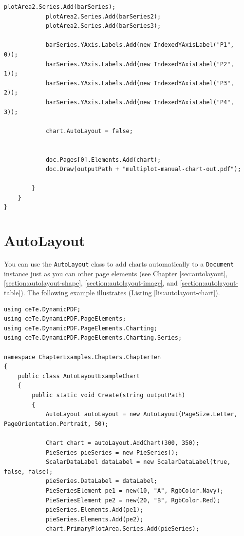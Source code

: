 \documentclass[american,letterpaper]{tufte-book}
\numberwithin{equation}{section}
\numberwithin{figure}{section}
\begin{document}
{\begin{lstlisting}[caption={A chart with two plot areas.},label={lis:two-plot-A-chart-with},basicstyle={\small\ttfamily},breaklines=true]
            plotArea2.Series.Add(barSeries);
            plotArea2.Series.Add(barSeries2);
            plotArea2.Series.Add(barSeries3);

            barSeries.YAxis.Labels.Add(new IndexedYAxisLabel("P1", 0));
            barSeries.YAxis.Labels.Add(new IndexedYAxisLabel("P2", 1));
            barSeries.YAxis.Labels.Add(new IndexedYAxisLabel("P3", 2));
            barSeries.YAxis.Labels.Add(new IndexedYAxisLabel("P4", 3));

            chart.AutoLayout = false;


            doc.Pages[0].Elements.Add(chart);
            doc.Draw(outputPath + "multiplot-manual-chart-out.pdf");

        }
    }
}
\end{lstlisting}
\leavevmode\egroup

\section{AutoLayout}
\label{section:autolayout-charts}
You can use the \texttt{AutoLayout} class to add charts automatically to a \texttt{Document} instance just as you can other page elements (see Chapter \ref{sec:autolayout}, \ref{section:autolayout-shape}, \ref{section:autolayout-image}, and \ref{section:autolayout-table}). The following example illustrates (Listing \ref{lis:autolayout-chart}).

\bgroup{}
\begin{lstlisting}[caption={Using AutoLayout to create a PDF document.},label={lis:autolayout-chart},basicstyle={\small\ttfamily},breaklines=true]
using ceTe.DynamicPDF;
using ceTe.DynamicPDF.PageElements;
using ceTe.DynamicPDF.PageElements.Charting;
using ceTe.DynamicPDF.PageElements.Charting.Series;

namespace ChapterExamples.Chapters.ChapterTen
{
    public class AutoLayoutExampleChart
    {
        public static void Create(string outputPath)
        {
            AutoLayout autoLayout = new AutoLayout(PageSize.Letter, PageOrientation.Portrait, 50);
            
            Chart chart = autoLayout.AddChart(300, 350);
            PieSeries pieSeries = new PieSeries();
            ScalarDataLabel dataLabel = new ScalarDataLabel(true, false, false);
            pieSeries.DataLabel = dataLabel;
            PieSeriesElement pe1 = new(10, "A", RgbColor.Navy);
            PieSeriesElement pe2 = new(20, "B", RgbColor.Red);
            pieSeries.Elements.Add(pe1);
            pieSeries.Elements.Add(pe2);
            chart.PrimaryPlotArea.Series.Add(pieSeries);


\end{lstlisting}}
\end{document}
